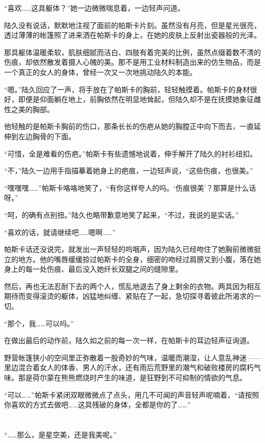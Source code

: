 “喜欢……这具躯体？”她一边微微喘息着，一边轻声问道。

陆久没有说话，默默地注视了面前的帕斯卡片刻。虽然没有月亮，但是星光很亮，透过薄薄的帐篷照了进来洒在帕斯卡的身上，在她的皮肤上反射出瓷器般的光泽。

那具躯体温暖柔软，肌肤细腻而洁白、四肢有着完美的比例，虽然点缀着数不清的伤痕，却依然散发着摄人心魄的美。那不是用工业材料制造出来的仿生物品，而是一个真正的女人的身体，曾经一次又一次地挑动陆久的本能。

“嗯。”陆久回应了一声，将手放在了帕斯卡的胸前，轻轻触摸着。帕斯卡的身材很好，即便是仰面躺在地上，前胸依然在明显地耸起，但陆久却不是在抚摸她象征雌性之美的胸部。

他轻触的是帕斯卡胸前的伤口，那条长长的伤疤从她的胸膛正中向下而去，一直延伸到左边胸骨的下面。

“可惜，全是难看的伤疤。”帕斯卡有些遗憾地说着，伸手解开了陆久的衬衫纽扣。

“不，”陆久一边用手指描摹着她身上的疤痕，一边轻声说，“这些伤痕，也很美。”

“嘿嘿嘿……”帕斯卡咯咯地笑了，“有你这样夸人的吗。‘伤痕很美’？那算是什么话呀。”

“呵，的确有点别扭。”陆久也略带歉意地笑了起来，“不过，我说的是实话。”

“喜欢的话，就请继续吧……嗯啊……”

帕斯卡话还没说完，就发出一声轻轻的呜咽声，因为陆久已经吻住了她胸前微微挺立的地方。他的嘴唇缓缓掠过帕斯卡的全身，细密的吻经过肩膀又到小腹，落在她身上的每一处伤痕、最后没入她纤长双腿之间的缝隙里。

然后，再也无法忍耐下去的两个人，慌乱地退去了身上剩余的衣物。两具因为相互期待而变得滚烫的躯体，凶猛地纠缠、紧贴在了一起，急切探寻着彼此所渴求的一切。

“那个，我……可以吗。”

在做出最后的动作前，陆久如之前的每一次一样，在帕斯卡的耳边轻声征询道。

野营帐篷狭小的空间里正弥散着一股奇妙的气味，温暖而潮湿，让人意乱神迷——里边混合着女人的体香、男人的汗水，还有雨后荒野里的潮气和破败楼房的腐朽气味。那是荷尔蒙在熊熊燃烧时产生的味道，是狂野到不可抑制的情欲的气息。

“可以……”帕斯卡紧闭双眼微微点了点头，用几不可闻的声音轻声呢喃着，“请按照你喜欢的方式去做吧……这具残破的身体，全都是你的了……”\section*{}

“……那么，是星空美，还是我美呢。”

